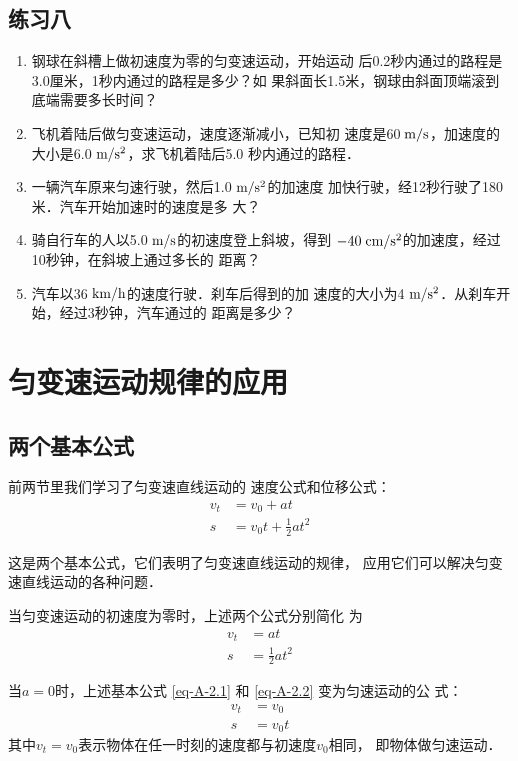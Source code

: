 \subsection*{练习八}
\begin{enumerate}
\item      钢球在斜槽上做初速度为零的匀变速运动，开始运动
后0.2秒内通过的路程是3.0厘米，1秒内通过的路程是多少？如
果斜面长1.5米，钢球由斜面顶端滚到底端需要多长时间？


\item     飞机着陆后做匀变速运动，速度逐渐减小，已知初
速度是60$\;\text{m}/\text{s}$，加速度的大小是6.0$\;\text{m}/\text{s}^2$，求飞机着陆后5.0
秒内通过的路程．


\item     一辆汽车原来匀速行驶，然后1.0$\;\text{m}/\text{s}^2$的加速度
加快行驶，经12秒行驶了180米．汽车开始加速时的速度是多
大？


\item     骑自行车的人以5.0$\;\text{m}/\text{s}$的初速度登上斜坡，得到
$-40 \;\text{cm}/\text{s}^2 $的加速度，经过10秒钟，在斜坡上通过多长的
距离？

\item    汽车以36$\;\text{km}/\text{h}$的速度行驶．刹车后得到的加
速度的大小为4$\;\text{m}/\text{s}^2$．从刹车开始，经过3秒钟，汽车通过的
距离是多少？


\end{enumerate}


\section{匀变速运动规律的应用}
    \subsection{两个基本公式}

前两节里我们学习了匀变速直线运动的
速度公式和位移公式：
\begin{align}
v_t&=v_0+at \label{eq-A-2.1} \\
s&=v_0 t+\frac{1}{2}at^2 \label{eq-A-2.2}
\end{align}

    这是两个基本公式，它们表明了匀变速直线运动的规律，
应用它们可以解决匀变速直线运动的各种问题．

    当匀变速运动的初速度为零时，上述两个公式分别简化
为
\begin{align}
v_t&=at \label{eq-A-2.3} \\
s&=\frac{1}{2}at^2 \label{eq-A-2.4}
\end{align}

当$a=0$时，上述基本公式 \eqref{eq-A-2.1} 和 \eqref{eq-A-2.2} 变为匀速运动的公
式：
\[\begin{split}
v_t&=v_0\\
s&=v_0t
\end{split}\]
其中$v_t=v_0$表示物体在任一时刻的速度都与初速度$v_0$相同，
即物体做匀速运动．

